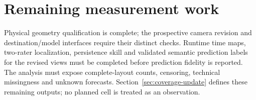 \documentclass[11pt]{article}
\begin{document}
\section{Remaining measurement work}
Physical geometry qualification is complete; the prospective camera revision and destination/model interfaces require their distinct checks. Runtime time maps, two-rater localization, persistence skill and validated semantic prediction labels for the revised views must be completed before prediction fidelity is reported. The analysis must expose complete-layout counts, censoring, technical missingness and unknown forecasts. Section~\ref{sec:coverage-update} defines these remaining outputs; no planned cell is treated as an observation.
\end{document}
